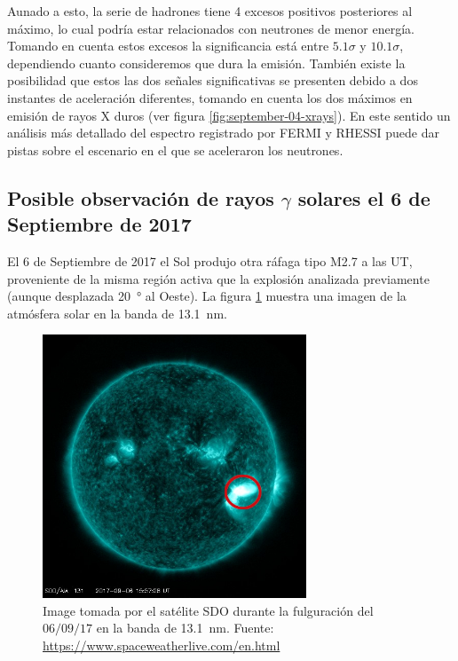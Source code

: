 Aunado a esto, la serie de hadrones tiene \num{4} excesos positivos posteriores al máximo, lo cual podría estar relacionados con neutrones de menor energía. Tomando en cuenta estos excesos la significancia está entre $5.1\sigma$ y $10.1\sigma$, dependiendo cuanto consideremos que dura la emisión. También existe la posibilidad que estos las dos señales significativas se presenten debido a dos instantes de aceleración diferentes, tomando en cuenta los dos máximos en emisión de rayos X duros (ver figura \ref{fig:september-04-xrays}). En este sentido un análisis más detallado del espectro registrado por FERMI y RHESSI puede dar pistas sobre el escenario en el que se aceleraron los neutrones.

\subsection{Posible observación de rayos $\gamma$ solares el 6 de Septiembre de 2017}

El \num{6} de Septiembre de \num{2017} el Sol produjo otra ráfaga tipo M\num{2.7} a las  UT, proveniente de la misma región activa que la explosión analizada previamente (aunque desplazada \SI{20}{\degree} al Oeste). La figura \ref{fig:september-06-flare} muestra una imagen de la atmósfera solar en la banda de \SI{13.1}{\nano\metre}.

\begin{figure}
        \centering
        \includegraphics[width=0.7\textwidth]{sdo170906-1550-13}
        \caption{Image tomada por el satélite SDO durante la fulguración del $06/09/17$ en la banda de \SI{13.1}{\nano\metre}. Fuente: \url{https://www.spaceweatherlive.com/en.html}}
        \label{fig:september-06-flare}
\end{figure}

